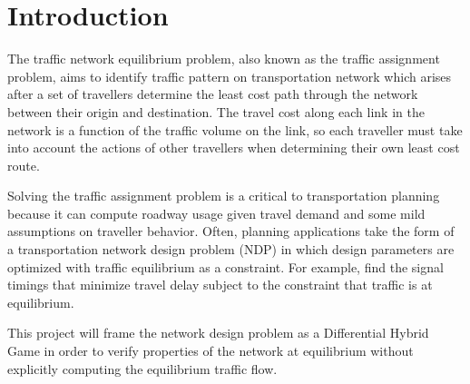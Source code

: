 \section{Introduction}

The traffic network equilibrium problem, also known as the traffic assignment problem, aims to identify traffic pattern on transportation network which arises after a set of travellers determine the least cost path through the network between their origin and destination.\citep{nagurney2009netecon}
The travel cost along each link in the network is a function of the traffic volume on the link, so each traveller must take into account the actions of other travellers when determining their own least cost route.

Solving the traffic assignment problem is a critical to transportation planning because it can compute roadway usage given travel demand and some mild assumptions on traveller behavior.
Often, planning applications take the form of a transportation network design problem (NDP) in which design parameters are optimized with traffic equilibrium as a constraint.
For example, \citet{sheffi1983optimal} find the signal timings that minimize travel delay subject to the constraint that traffic is at equilibrium.

This project will frame the network design problem as a Differential Hybrid Game \citep{DBLP:journals/tocl/Platzer17} in order to verify properties of the network at equilibrium without explicitly computing the equilibrium traffic flow.
